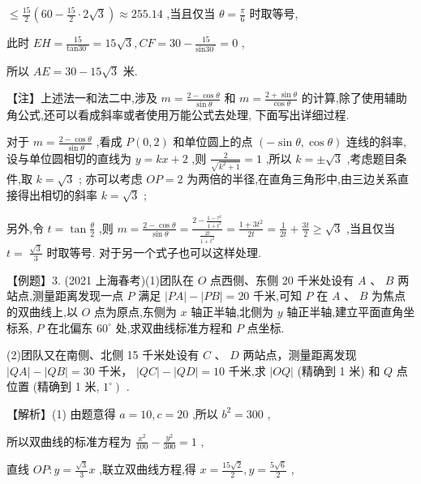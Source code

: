 \documentclass[10pt]{article}
\begin{document}
\(\leq  \frac{15}{2}\left( {{60} - \frac{15}{2} \cdot  2\sqrt{3}}\right)  \approx  {255.14}\) ,当且仅当 \(\theta  = \frac{\pi }{6}\) 时取等号,

此时 \({EH} = \frac{15}{{\operatorname{tan30}}^{ \circ  }} = {15}\sqrt{3},{CF} = {30} - \frac{15}{{\operatorname{sin30}}^{ \circ  }} = 0\) ,

所以 \({AE} = {30} - {15}\sqrt{3}\) 米.

【注】上述法一和法二中,涉及 \(m = \frac{2 - \cos \theta }{\sin \theta }\) 和 \(m = \frac{2 + \sin \theta }{\cos \theta }\) 的计算,除了使用辅助角公式,还可以看成斜率或者使用万能公式去处理, 下面写出详细过程.

对于 \(m = \frac{2 - \cos \theta }{\sin \theta }\) ,看成 \(P\left( {0,2}\right)\) 和单位圆上的点 \(\left( {-\sin \theta ,\cos \theta }\right)\) 连线的斜率,设与单位圆相切的直线为 \(y = {kx} + 2\) ,则 \(\frac{2}{\sqrt{{k}^{2} + 1}} = 1\) ,所以 \(k =  \pm  \sqrt{3}\) ,考虑题目条件,取 \(k = \sqrt{3}\) ; 亦可以考虑 \({OP} = 2\) 为两倍的半径,在直角三角形中,由三边关系直接得出相切的斜率 \(k = \sqrt{3}\) ;

另外,令 \(t = \tan \frac{\theta }{2}\) ,则 \(m = \frac{2 - \cos \theta }{\sin \theta } = \frac{2 - \frac{1 - {\tau }^{2}}{1 + {t}^{2}}}{\frac{2t}{1 + {t}^{2}}} = \frac{1 + 3{t}^{2}}{2t} = \frac{1}{2t} + \frac{3t}{2} \geq  \sqrt{3}\) ,当且仅当 \(t = \; \frac{\sqrt{3}}{3}\) 时取等号. 对于另一个式子也可以这样处理.

【例题】3. (2021 上海春考)(1)团队在 \(O\) 点西侧、东侧 20 千米处设有 \(A\) 、 \(B\) 两站点,测量距离发现一点 \(P\) 满足 \(\left| {PA}\right|  - \left| {PB}\right|  = {20}\) 千米,可知 \(P\) 在 \(A\text{ 、 }B\) 为焦点的双曲线上,以 \(O\) 点为原点,东侧为 \(x\) 轴正半轴,北侧为 \(y\) 轴正半轴,建立平面直角坐标系, \(P\) 在北偏东 \({60}^{ \circ  }\) 处,求双曲线标准方程和 \(P\) 点坐标.

(2)团队又在南侧、北侧 15 千米处设有 \(C\) 、 \(D\) 两站点，测量距离发现 \(\left| {QA}\right|  - \left| {QB}\right|  = {30}\) 千米， \(\left| {QC}\right|  - \left| {QD}\right|  = {10}\) 千米,求 \(\left| {OQ}\right|\) (精确到 1 米) 和 \(Q\) 点位置 (精确到 1 米, \(\left. {1}^{ \circ  }\right)\) .

【解析】(1) 由题意得 \(a = {10},c = {20}\) ,所以 \({b}^{2} = {300}\) ,

所以双曲线的标准方程为 \(\frac{{x}^{2}}{100} - \frac{{y}^{2}}{300} = 1\) ,

直线 \({OP} : y = \frac{\sqrt{3}}{3}x\) ,联立双曲线方程,得 \(x = \frac{{15}\sqrt{2}}{2},y = \frac{5\sqrt{6}}{2}\) ,
\end{document}
